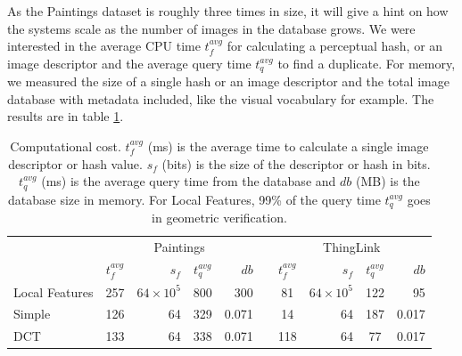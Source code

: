 \documentclass[english,12pt,a4paper,pdftex,elec,utf8, table]{aaltothesis}
\begin{document}

As the Paintings dataset is roughly three times in size, it will give a hint on how the systems scale as the number of images in the database grows. We were interested in the average CPU time $t_f^{avg}$ for calculating a perceptual hash, or an image descriptor and the average query time $t_q^{avg}$ to find a duplicate. For memory, we measured the size of a single hash or an image descriptor and the total image database with metadata included, like the visual vocabulary for example. The results are in table \ref{computationalcost}.

\begin{table} \footnotesize
  \caption{Computational cost. $t_f^{avg}$ (ms) is the average time to calculate a single image descriptor or hash value. $s_f$ (bits) is the size of the descriptor or hash in bits. $t_q^{avg}$ (ms) is the average query time from the database and $db$ (MB) is the database size in memory. For Local Features, 99\% of the query time $t_q^{avg}$ goes in geometric verification.}
\label{computationalcost}
\begin{center}
  \setlength\tabcolsep{3pt} %
  \begin{tabular}{@{}lcrcrrcrcr@{}}
    \toprule
    & \multicolumn{4}{c}{Paintings} &\phantom{abc} &\multicolumn{4}{c}{ThingLink}\\
\cmidrule{2-6} \cmidrule{7-10}
  & $t_f^{avg} $&  $s_f$ & $t_q^{avg}$& $db$ &\phantom{abc} & $t_f^{avg} $&  $s_f$& $t_q^{avg}$& $db$\\ \midrule
    Local Features & 257 & $64 \times 10^5$ & 800 & 300&\phantom{abc} & 81 & $64 \times 10^5$& 122 &95\\
    Simple & 126 & 64 & 329 & 0.071 &\phantom{abc} & 14 & 64 & 187 & 0.017\\
    DCT   & 133 & 64 & 338 & 0.071 & \phantom{abc} & 118 & 64 & 77 & 0.017\\
 \bottomrule
\end{tabular}
\end{center}\end{table}
\end{document}

